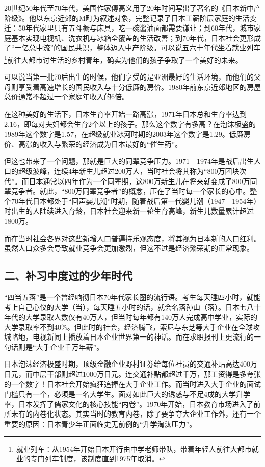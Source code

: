 20世纪50年代至70年代，美国作家傅高义用了20年时间写出了著名的《日本新中产阶级》。他以东京近郊的M町为叙述对象，完整记录了日本工薪阶层家庭的生活变迁：50年代家里只有五斗橱与床具，吃一碗酱油面都需要谦让；到60年代，城市家庭基本实现电视机、洗衣机与冰箱全覆盖的生活改善；到70年代，日本社会更形成了“一亿总中流”的国民共识，整体迈入中产阶级。可以说五六十年代坐着就业列车\footnote{就业列车：从1954年开始日本开行由中学老师带队，带着年轻人前往大都市就业的专门列车制度，该制度直到1975年取消。}前往大都市讨生活的乡村青年，确实为他们的孩子争取了一个美好的未来。

可以说当第一批70后出生的时候，他们享受的是亚洲最好的生活环境，而他们的父母则享受着高速增长的国民收入与十分低廉的房价。1980年前东京近郊地区的房屋总价通常不超过一个家庭年收入的6倍。

在这种美好的生活下，日本生育率开始一路高涨，1971年日本总和生育率达到2.16，即每对夫妇都会生育2个以上的孩子。那么这个数字有多高？在泡沫极盛的1989年这个数字是1.57，在超级就业冰河时期的2003年这个数字是1.29。低廉房价、高涨的收入与繁荣的经济成为日本最好的“催生药”。

但这也带来了一个问题，那就是巨大的同辈竞争压力。1971—1974年是战后出生人口的超级波峰，连续4年新生儿超过200万人，当时社会将其称为“800万团块次代”。而日本通常以四年作为一个同辈期，这800万新生儿在将来就变成了800万同辈竞争者。就此，“800万同辈竞争者”的概念，压在了当时每一个家长的心中。整个70年代日本都处于“回声婴儿潮”时期，随着战后第一代婴儿潮（1947—1954年）时出生的人陆续进入育龄，日本社会迎来新一轮生育高峰，新生儿数量累计超过1800万。

而在当时社会各界对这些新增人口普遍持乐观态度，将其视为日本新的人口红利。虽然人口众多会导致就业竞争会更加激烈，但这不过是经济繁荣期的正常现象。

\subsection{二、补习中度过的少年时代}

“四当五落”是一个曾经响彻日本70年代家长圈的流行语。考生每天睡四小时，就能考上自己心仪的大学（当），每天睡五小时的话，就会名落孙山（落）。日本七八十年代的大学录取人数仅有40万人，但当时每年都有140万人完成高中学业，实际的大学录取率不到40\%。但此时的社会，经济腾飞，索尼与东芝等大手企业在全球攻城略地，电视新闻上播放着日本企业世界第一的神话。而在求职报刊上更流行的一句话则是“大手企业千万年薪”。

日本泡沫经济极盛时期，顶级金融企业野村证券给每位社员的交通补贴高达400万日元，而中层干部则超过1000万日元。连交通补贴都超过千万，那工资得是多夸张的一个数字！日本社会开始疯狂追捧在大手企业工作。而当时进入大手企业的面试门槛只有一个，必须是一名大学生。面对如此巨大的诱惑与不足4成的大学升学率，日本发挥了儒家文化的核心技能“内卷”。1970年开始，日本教育市场进入了前所未有的内卷化状态。其实当时的教育内卷，除了要争夺大企业工作外，还有一个重要的原因：日本青少年正面临史无前例的“升学淘汰压力”。

